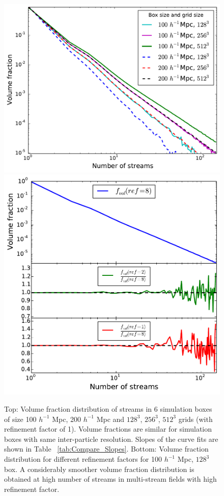 \begin{figure}
\begin{minipage}[t]{.99\linewidth}
 \centering\includegraphics[width=10.cm]{Chapter3/Source_v2/fig3a} 
  \centering\includegraphics[width=10.cm]{Chapter3/Source_v2/fig3b}
\end{minipage}\hfill
\caption{Top: Volume fraction distribution of streams in 6 simulation boxes of size 100 $h^{-1}$ Mpc, 200 $h^{-1}$ Mpc 
and $128^{3}$, $256^{3}$, $512^{3}$ grids (with refinement factor of 1). Volume fractions are similar for simulation boxes with same inter-particle resolution. Slopes of the curve fits are shown in Table ~\ref{tab:Compare_Slopes}. Bottom: Volume fraction distribution for different refinement factors for 100 $h^{-1}$ Mpc, $128^{3}$ box. A considerably smoother volume fraction distribution is obtained at high number of streams in multi-stream fields with high refinement factor. }
\label{fig:Vfr_all}
\end{figure}

